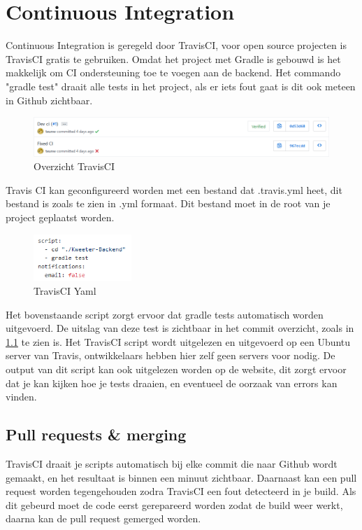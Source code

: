 \chapter{Continuous Integration}
Continuous Integration is geregeld door TravisCI, voor open source projecten is TravisCI gratis te gebruiken.
Omdat het project met Gradle is gebouwd is het makkelijk om CI ondersteuning toe te voegen aan de backend.
Het commando "gradle test" draait alle tests in het project, als er iets fout gaat is dit ook meteen in Github zichtbaar.

\begin{figure}[H]
	\includegraphics[width=\textwidth]{images/TravisCi.png}
	\caption{Overzicht TravisCI}
	\label{fig:travisci-commits}
\end{figure}
Travis CI kan geconfigureerd worden met een bestand dat .travis.yml heet, dit bestand is zoals te zien in .yml formaat.
Dit bestand moet in de root van je project geplaatst worden. 
\begin{figure}[H]
	\centering\includegraphics[width=0.33\textwidth]{images/TravisCIYml}
	\caption{TravisCI Yaml}
	\label{travisyml}
\end{figure}

Het bovenstaande script zorgt ervoor dat gradle tests automatisch worden uitgevoerd.
De uitslag van deze test is zichtbaar in het commit overzicht, zoals in \cref{fig:travisci-commits} te zien is.
Het TravisCI script wordt uitgelezen en uitgevoerd op een Ubuntu server van Travis, ontwikkelaars hebben hier zelf geen servers voor nodig.
De output van dit script kan ook uitgelezen worden op de website, dit zorgt ervoor dat je kan kijken hoe je tests draaien, en eventueel de oorzaak van errors kan vinden.

\section{Pull requests \& merging}
TravisCI draait je scripts automatisch bij elke commit die naar Github wordt gemaakt, en het resultaat is binnen een minuut zichtbaar.
Daarnaast kan een pull request worden tegengehouden zodra TravisCI een fout detecteerd in je build.
Als dit gebeurd moet de code eerst gerepareerd worden zodat de build weer werkt, daarna kan de pull request gemerged worden.